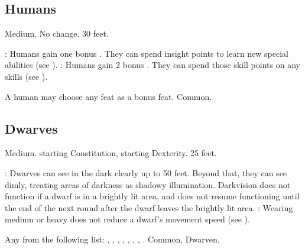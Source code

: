 \subsection{Humans}
 Medium.
 No change.
 30 feet.
\begin{itemize}
    : Humans gain one bonus . They can spend insight points to learn new special abilities (see ).
    : Humans gain 2 bonus . They can spend those skill points on any skills (see ).
\end{itemize}
 A human may choose any feat as a bonus feat.
 Common.

\subsection{Dwarves}
 Medium.
  starting Constitution,  starting Dexterity.
 25 feet.
\begin{itemize}
    : Dwarves can see in the dark clearly up to 50 feet.   Beyond that, they can see dimly, treating areas of darkness as shadowy illumination. Darkvision does not function if a dwarf is in a brightly lit area, and does not resume functioning until the end of the next round after the dwarf leaves the brightly lit area.
    : Wearing medium or heavy  does not reduce a dwarf's movement speed (see ).
\end{itemize}
 Any from the following list: , , , , , , , .
 Common, Dwarven.

